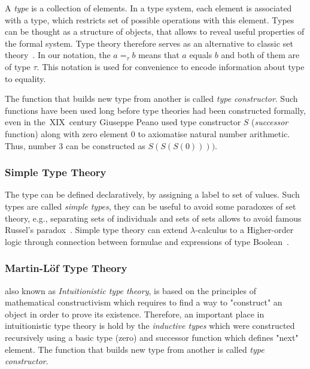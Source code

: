 \documentclass[article]{aaltoseries}
\begin{document}
A \textit{type} is a collection of elements. In a type system, each element is associated with a type, which restricts set of possible operations with this element. Types can be thought as a structure of objects, that allows to reveal useful properties of the formal system. Type theory therefore serves as an alternative to classic set theory~\cite{Tho91}.
In our notation, the $a =_{\tau} b$ means that $a$ equals $b$ and both of them are of type $\tau$. This notation is used for convenience to encode information about type to equality.

The function that builds new type from another is called \textit{type constructor}. Such functions have been used long before type theories had been constructed formally, even in the~XIX~century Giuseppe Peano used type constructor $S$ (\textit{successor} function) along with zero element 0 to axiomatise natural number arithmetic. Thus, number 3 can be constructed as $S(S(S(0))))$.


\subsubsection{Simple Type Theory}
The type can be defined declaratively, by assigning a label to set of values. Such types are called \textit{simple types}, they can be useful to avoid some paradoxes of set theory, e.g., separating sets of individuals and sets of sets allows to avoid famous Russel's paradox~\cite{Irv95}. Simple type theory can extend $\lambda$-calculus to a Higher-order logic through connection between formulae and expressions of type Boolean~\cite{Paulson90}.




\subsubsection{Martin-Löf Type Theory}
also known as \textit{Intuitionistic type theory}, is based on the principles of mathematical constructivism which requires to find a way to "construct" an object in order to prove its existence. Therefore, an important place in intuitionistic type theory is hold by the \textit{inductive types} which were constructed recursively using a basic type (zero) and successor function which defines "next" element. The function that builds new type from another is called \textit{type constructor}.
\end{document}
